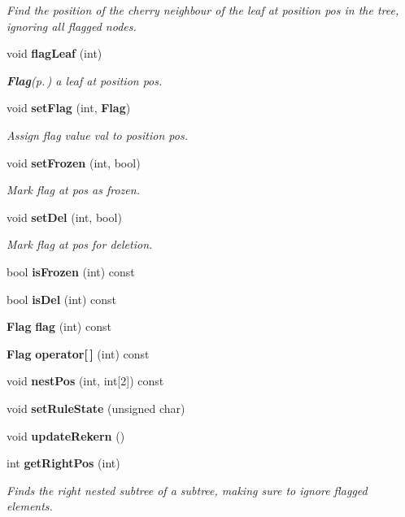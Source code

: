 \begin{CompactItemize}
\begin{CompactList}\small\item\em Find the position of the cherry neighbour of the leaf at position pos in the tree, ignoring all flagged nodes. \item\end{CompactList}\item 
void {\bf flag\-Leaf} (int)
\begin{CompactList}\small\item\em {\bf Flag}{\rm (p.\,\pageref{structFlagTable_1_1Flag})} a leaf at position pos. \item\end{CompactList}\item 
void {\bf set\-Flag} (int, {\bf Flag})
\begin{CompactList}\small\item\em Assign flag value val to position pos. \item\end{CompactList}\item 
void {\bf set\-Frozen} (int, bool)
\begin{CompactList}\small\item\em Mark flag at pos as frozen. \item\end{CompactList}\item 
void {\bf set\-Del} (int, bool)
\begin{CompactList}\small\item\em Mark flag at pos for deletion. \item\end{CompactList}\item 
bool {\bf is\-Frozen} (int) const 
\item 
bool {\bf is\-Del} (int) const 
\item 
{\bf Flag} {\bf flag} (int) const 
\item 
{\bf Flag} {\bf operator[$\,$]} (int) const 
\item 
void {\bf nest\-Pos} (int, int[2]) const 
\item 
void {\bf set\-Rule\-State} (unsigned char)
\item 
void {\bf update\-Rekern} ()
\item 
int {\bf get\-Right\-Pos} (int)
\begin{CompactList}\small\item\em Finds the right nested subtree of a subtree, making sure to ignore flagged elements. \item\end{CompactList}\end{CompactItemize}

